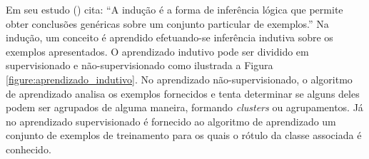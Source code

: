 
Em seu estudo  
(\citeyear{monard_baranauskas:2003}) cita: ``A indução é a forma de 
inferência lógica que permite obter conclusões genéricas sobre um conjunto 
particular de exemplos.'' Na indução, um conceito é aprendido efetuando-se 
inferência indutiva sobre os exemplos apresentados. O aprendizado indutivo 
pode ser dividido em supervisionado e não-supervisionado como ilustrada a 
Figura \ref{figure:aprendizado_indutivo}. No aprendizado não-supervisionado, o 
algoritmo de aprendizado analisa os exemplos fornecidos e tenta determinar se 
alguns deles podem ser agrupados de alguma maneira, formando \textit{clusters} 
ou agrupamentos. Já no aprendizado supervisionado é fornecido ao algoritmo de 
aprendizado um conjunto de exemplos de treinamento para os quais o rótulo da 
classe associada é conhecido.

